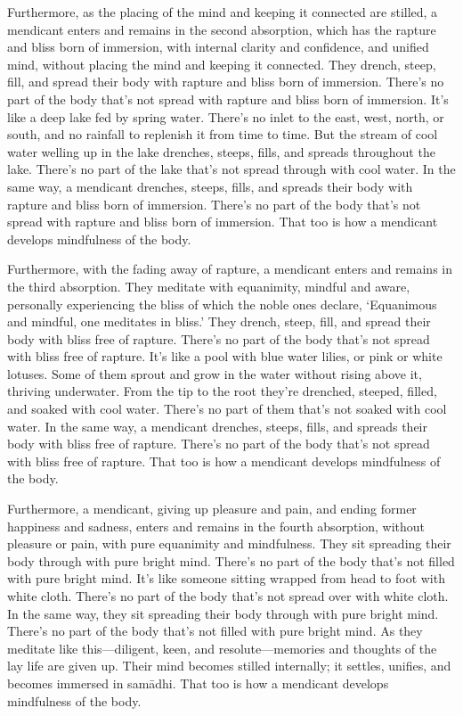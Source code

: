 \documentclass[12pt,openany]{book}%
\begin{document}
Furthermore, as the placing of the mind and keeping it connected are stilled, a mendicant enters and remains in the second absorption, which has the rapture and bliss born of immersion, with internal clarity and confidence, and unified mind, without placing the mind and keeping it connected. They drench, steep, fill, and spread their body with rapture and bliss born of immersion. There’s no part of the body that’s not spread with rapture and bliss born of immersion. It’s like a deep lake fed by spring water. There’s no inlet to the east, west, north, or south, and no rainfall to replenish it from time to time. But the stream of cool water welling up in the lake drenches, steeps, fills, and spreads throughout the lake. There’s no part of the lake that’s not spread through with cool water. In the same way, a mendicant drenches, steeps, fills, and spreads their body with rapture and bliss born of immersion. There’s no part of the body that’s not spread with rapture and bliss born of immersion. That too is how a mendicant develops mindfulness of the body. 

Furthermore, with the fading away of rapture, a mendicant enters and remains in the third absorption. They meditate with equanimity, mindful and aware, personally experiencing the bliss of which the noble ones declare, ‘Equanimous and mindful, one meditates in bliss.’ They drench, steep, fill, and spread their body with bliss free of rapture. There’s no part of the body that’s not spread with bliss free of rapture. It’s like a pool with blue water lilies, or pink or white lotuses. Some of them sprout and grow in the water without rising above it, thriving underwater. From the tip to the root they’re drenched, steeped, filled, and soaked with cool water. There’s no part of them that’s not soaked with cool water. In the same way, a mendicant drenches, steeps, fills, and spreads their body with bliss free of rapture. There’s no part of the body that’s not spread with bliss free of rapture. That too is how a mendicant develops mindfulness of the body. 

Furthermore, a mendicant, giving up pleasure and pain, and ending former happiness and sadness, enters and remains in the fourth absorption, without pleasure or pain, with pure equanimity and mindfulness. They sit spreading their body through with pure bright mind. There’s no part of the body that’s not filled with pure bright mind. It’s like someone sitting wrapped from head to foot with white cloth. There’s no part of the body that’s not spread over with white cloth. In the same way, they sit spreading their body through with pure bright mind. There’s no part of the body that’s not filled with pure bright mind. As they meditate like this—diligent, keen, and resolute—memories and thoughts of the lay life are given up. Their mind becomes stilled internally; it settles, unifies, and becomes immersed in \textsanskrit{samādhi}. That too is how a mendicant develops mindfulness of the body. 
\end{document}
